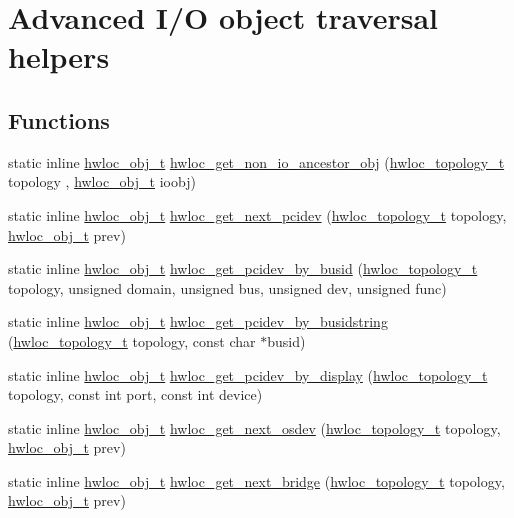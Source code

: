 \hypertarget{a00064}{
\section{Advanced I/O object traversal helpers}
\label{a00064}
}
\subsection*{Functions}
\begin{DoxyCompactItemize}
\item 
static inline \hyperlink{a00016}{hwloc\_\-obj\_\-t} \hyperlink{a00064_ga3603275746a8792e54415d79763aa9e9}{hwloc\_\-get\_\-non\_\-io\_\-ancestor\_\-obj} (\hyperlink{a00039_ga9d1e76ee15a7dee158b786c30b6a6e38}{hwloc\_\-topology\_\-t} topology , \hyperlink{a00016}{hwloc\_\-obj\_\-t} ioobj)
\item 
static inline \hyperlink{a00016}{hwloc\_\-obj\_\-t} \hyperlink{a00064_gad6e1ed122ef3b6e098538d75acd5e3f6}{hwloc\_\-get\_\-next\_\-pcidev} (\hyperlink{a00039_ga9d1e76ee15a7dee158b786c30b6a6e38}{hwloc\_\-topology\_\-t} topology, \hyperlink{a00016}{hwloc\_\-obj\_\-t} prev)
\item 
static inline \hyperlink{a00016}{hwloc\_\-obj\_\-t} \hyperlink{a00064_ga546e1d690c63fb24177f3013ed78ceb1}{hwloc\_\-get\_\-pcidev\_\-by\_\-busid} (\hyperlink{a00039_ga9d1e76ee15a7dee158b786c30b6a6e38}{hwloc\_\-topology\_\-t} topology, unsigned domain, unsigned bus, unsigned dev, unsigned func)
\item 
static inline \hyperlink{a00016}{hwloc\_\-obj\_\-t} \hyperlink{a00064_ga9d5643f2e337fe1b98e7cce5c1ecb74e}{hwloc\_\-get\_\-pcidev\_\-by\_\-busidstring} (\hyperlink{a00039_ga9d1e76ee15a7dee158b786c30b6a6e38}{hwloc\_\-topology\_\-t} topology, const char $\ast$busid)
\item 
static inline \hyperlink{a00016}{hwloc\_\-obj\_\-t} \hyperlink{a00064_ga0c68e88104c986d19e21e5bc44c7abd4}{hwloc\_\-get\_\-pcidev\_\-by\_\-display} (\hyperlink{a00039_ga9d1e76ee15a7dee158b786c30b6a6e38}{hwloc\_\-topology\_\-t} topology, const int port, const int device)
\item 
static inline \hyperlink{a00016}{hwloc\_\-obj\_\-t} \hyperlink{a00064_ga73a5bc6265642e6001f7a10812ab886d}{hwloc\_\-get\_\-next\_\-osdev} (\hyperlink{a00039_ga9d1e76ee15a7dee158b786c30b6a6e38}{hwloc\_\-topology\_\-t} topology, \hyperlink{a00016}{hwloc\_\-obj\_\-t} prev)
\item 
static inline \hyperlink{a00016}{hwloc\_\-obj\_\-t} \hyperlink{a00064_ga2bd3f856d0fc3c6c02642c17d763b823}{hwloc\_\-get\_\-next\_\-bridge} (\hyperlink{a00039_ga9d1e76ee15a7dee158b786c30b6a6e38}{hwloc\_\-topology\_\-t} topology, \hyperlink{a00016}{hwloc\_\-obj\_\-t} prev)

\end{DoxyCompactItemize}
